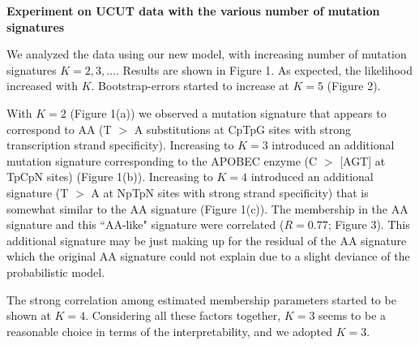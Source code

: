 \documentclass{article}
\begin{document}

\vspace*{1.0cm}
{\LARGE \bf Experiment on UCUT data with the various number of mutation signatures}
\vspace*{0.25cm}


We analyzed the data using our new model, with increasing number of mutation signatures $K=2,3,\dots$. 
Results are shown in Figure 1.
As expected, the likelihood increased with $K$. Bootstrap-errors started to increase at $K = 5$ (Figure 2).

With $K = 2$ (Figure 1(a)) we observed a mutation signature that appears to correspond to AA  (T $>$ A substitutions at CpTpG sites with strong transcription strand specificity).
Increasing to  $K=3$ introduced an additional mutation signature corresponding to the APOBEC enzyme (C $>$ [AGT] at TpCpN sites) (Figure 1(b)).
Increasing to $K = 4$ introduced an additional signature (T $>$ A at NpTpN sites with strong strand specificity) 
that is somewhat similar to the AA signature 
(Figure 1(c)). 
The membership in the AA signature and this ``AA-like" signature were correlated ($R = 0.77$; Figure 3). 
This additional signature may be just making up for the residual of the AA signature 
which the original AA signature could not explain due to a slight deviance of the probabilistic model.

The strong correlation among estimated membership parameters started to be shown at $K = 4$.
Considering all these factors together, $K = 3$ seems to be a reasonable choice in terms of the interpretability,
and we adopted $K = 3$.



\end{document}
